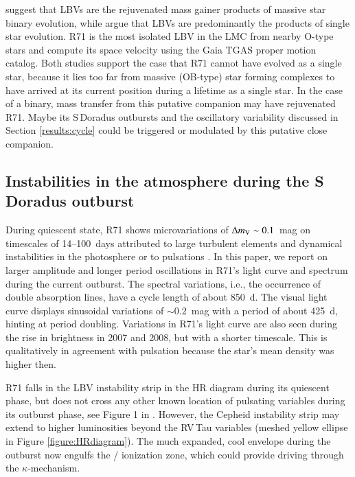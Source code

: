 \documentclass[structabstract]{aa}
\begin{document}
\citet{2015MNRAS.447..598S} suggest that LBVs are the rejuvenated mass gainer products of massive star binary evolution, while \citet{2016ApJ...825...64H} argue that LBVs are predominantly the products of single star evolution. 
R71 is the most isolated LBV in the LMC from nearby O-type stars \citep{2015MNRAS.447..598S} and \citet{2016arXiv161105504L} compute its space velocity using the Gaia TGAS proper motion catalog. Both studies support the case that R71 cannot have evolved as a single star, because it lies too far from massive (OB-type) star forming complexes to have arrived at its current position during a lifetime as a single star. In the case of a binary, mass transfer from this putative companion may have rejuvenated R71. Maybe its S\,Doradus outbursts and the oscillatory variability discussed in Section \ref{results:cycle} could be triggered or modulated by this putative close companion. 


\subsection{Instabilities in the atmosphere during the S\,Doradus outburst}
\label{discussion:pulsations}


During quiescent state, R71 shows microvariations of $\Delta m_{\textnormal{\scriptsize{V}}}\sim0.1$~mag on timescales of 14--100~days attributed to large turbulent elements and dynamical instabilities in the photosphere or to pulsations \citep{1985A&A...153..163V,1988A&AS...74..453V,1997A&AS..124..517V,1998A&A...335..605L}.
In this paper, we report on larger amplitude and longer period oscillations in R71's light curve and spectrum during the current outburst. 
The spectral variations, i.e., the occurrence of double absorption lines, have a cycle length of about 850~d. The visual light curve displays sinusoidal variations of $\sim0.2$~mag with a period of about 425~d, hinting at period doubling. Variations in R71's light curve are also seen during the rise in brightness in 2007 and 2008, but with a shorter timescale. This is qualitatively in agreement with pulsation because the star's mean density was higher then.

R71 falls in the LBV instability strip in the HR diagram during its quiescent phase, but does not cross any other known location of pulsating variables during its outburst phase, see Figure 1 in \citet{2016MNRAS.458.1352J}. However, the Cepheid instability strip may extend to higher luminosities beyond the RV\,Tau variables (meshed yellow ellipse in Figure \ref{figure:HRdiagram}). 
The much expanded, cool envelope during the outburst now engulfs the / ionization zone, which could provide driving through the $\kappa$-mechanism.
\end{document}
